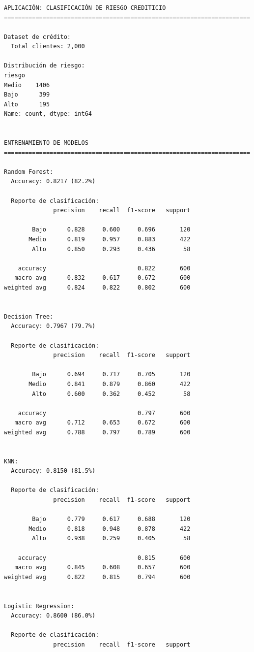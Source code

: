 \documentclass[
  doc,
  floatsintext,
  longtable,
  a4paper,
  nolmodern,
  notxfonts,
  notimes,
  12pt,
  colorlinks=true,linkcolor=blue,citecolor=blue,urlcolor=blue]{apa7}
\begin{document}
\begin{verbatim}



APLICACIÓN: CLASIFICACIÓN DE RIESGO CREDITICIO
======================================================================

Dataset de crédito:
  Total clientes: 2,000

Distribución de riesgo:
riesgo
Medio    1406
Bajo      399
Alto      195
Name: count, dtype: int64


ENTRENAMIENTO DE MODELOS
======================================================================

Random Forest:
  Accuracy: 0.8217 (82.2%)

  Reporte de clasificación:
              precision    recall  f1-score   support

        Bajo      0.828     0.600     0.696       120
       Medio      0.819     0.957     0.883       422
        Alto      0.850     0.293     0.436        58

    accuracy                          0.822       600
   macro avg      0.832     0.617     0.672       600
weighted avg      0.824     0.822     0.802       600


Decision Tree:
  Accuracy: 0.7967 (79.7%)

  Reporte de clasificación:
              precision    recall  f1-score   support

        Bajo      0.694     0.717     0.705       120
       Medio      0.841     0.879     0.860       422
        Alto      0.600     0.362     0.452        58

    accuracy                          0.797       600
   macro avg      0.712     0.653     0.672       600
weighted avg      0.788     0.797     0.789       600


KNN:
  Accuracy: 0.8150 (81.5%)

  Reporte de clasificación:
              precision    recall  f1-score   support

        Bajo      0.779     0.617     0.688       120
       Medio      0.818     0.948     0.878       422
        Alto      0.938     0.259     0.405        58

    accuracy                          0.815       600
   macro avg      0.845     0.608     0.657       600
weighted avg      0.822     0.815     0.794       600


Logistic Regression:
  Accuracy: 0.8600 (86.0%)

  Reporte de clasificación:
              precision    recall  f1-score   support


\end{verbatim}
\end{document}
